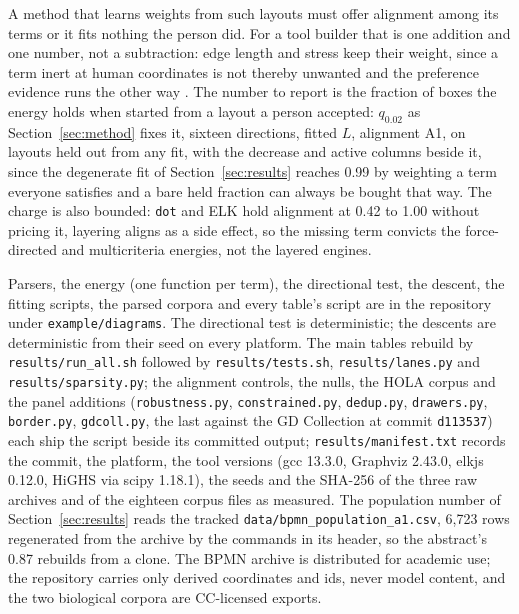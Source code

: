 \documentclass[11pt]{article}
\begin{document}
A method that learns weights from such layouts must offer alignment among its terms or it
fits nothing the person did. For a tool builder that is one addition and one number, not a
subtraction: edge length and stress keep their weight, since a term inert at human
coordinates is not thereby unwanted and the preference evidence runs the other way
\cite{mooney25, dwyer09}. The number to report is the fraction of boxes
the energy holds when started from a layout a person accepted: $q_{0.02}$ as
Section~\ref{sec:method} fixes it, sixteen directions, fitted $L$, alignment A1, on
layouts held out from any fit, with the decrease and active columns beside it, since the
degenerate fit of Section~\ref{sec:results} reaches 0.99 by weighting a term everyone
satisfies and a bare held fraction can always be bought that way. The charge is also
bounded: \texttt{dot} and ELK hold alignment at 0.42 to 1.00 without pricing it, layering
aligns as a side effect, so the missing term convicts the force-directed and
multicriteria energies, not the layered engines.


Parsers, the energy (one function per term), the directional test, the descent, the fitting
scripts, the parsed corpora and every table's script are in the repository under
\texttt{example/diagrams}. The directional test is deterministic; the descents are
deterministic from their seed on every platform. The main tables rebuild by
\texttt{results/run\_all.sh} followed by
\texttt{results/tests.sh}, \texttt{results/lanes.py} and \texttt{results/sparsity.py};
the alignment controls, the nulls, the HOLA corpus and the panel additions
(\texttt{robustness.py}, \texttt{constrained.py}, \texttt{dedup.py},
\texttt{drawers.py}, \texttt{border.py}, \texttt{gdcoll.py}, the last against the GD
Collection at commit \texttt{d113537}) each ship the script beside its committed output;
\texttt{results/manifest.txt} records the commit, the platform, the tool versions (gcc 13.3.0,
Graphviz 2.43.0, elkjs 0.12.0, HiGHS via scipy 1.18.1), the seeds and the SHA-256 of the
three raw archives and of the eighteen corpus files as measured. The population number
of Section~\ref{sec:results} reads the tracked
\texttt{data/bpmn\_population\_a1.csv}, 6{,}723 rows regenerated from the archive by the
commands in its header, so the abstract's 0.87 rebuilds from a clone. The BPMN archive is
distributed for academic use; the repository carries only derived coordinates and ids,
never model content, and the two biological corpora are CC-licensed exports.
\end{document}
